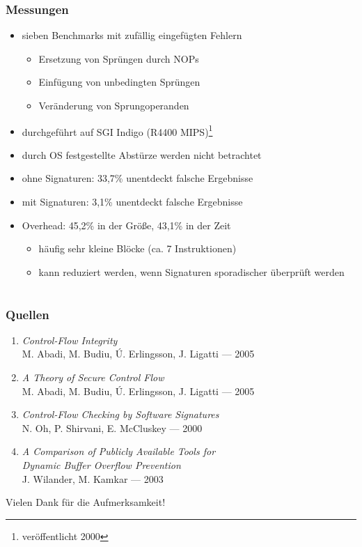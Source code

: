 \documentclass[mathserif,slidestop,compress,red]{beamer}
\begin{document}
\begin{frame}
  \frametitle{Messungen}
  \begin{itemize}
    \item sieben Benchmarks mit zufällig eingefügten Fehlern
    \begin{itemize}
      \item Ersetzung von Sprüngen durch NOPs
      \item Einfügung von unbedingten Sprüngen
      \item Veränderung von Sprungoperanden
    \end{itemize}
    \item durchgeführt auf SGI Indigo (R4400 MIPS)\footnote{veröffentlicht 2000}
    \item durch OS festgestellte Abstürze werden nicht betrachtet
    \item ohne Signaturen: 33,7\% unentdeckt falsche Ergebnisse
    \item mit Signaturen: 3,1\% unentdeckt falsche Ergebnisse
    \item Overhead: 45,2\% in der Größe, 43,1\% in der Zeit
    \begin{itemize}
      \item häufig sehr kleine Blöcke (ca. 7 Instruktionen)
      \item kann reduziert werden, wenn Signaturen sporadischer überprüft werden
    \end{itemize}
  \end{itemize}
\end{frame}

\section*{}

\begin{frame}
  \frametitle{Quellen}
  \begin{enumerate}
    \item \emph{Control-Flow Integrity} \\ M. Abadi, M. Budiu, Ú. Erlingsson, J. Ligatti — 2005
    \item \emph{A Theory of Secure Control Flow} \\ M. Abadi, M. Budiu, Ú. Erlingsson, J. Ligatti — 2005
    \item \emph{Control-Flow Checking by Software Signatures} \\ N. Oh, P. Shirvani, E. McCluskey — 2000
    \item \emph{A Comparison of Publicly Available Tools for \\ Dynamic Buffer Overflow Prevention} \\
        J. Wilander, M. Kamkar — 2003
  \end{enumerate}
\end{frame}

{
\begin{frame}[c,plain]
  \begin{center}
    Vielen Dank für die Aufmerksamkeit!
  \end{center}
\end{frame}
}
\end{document}
